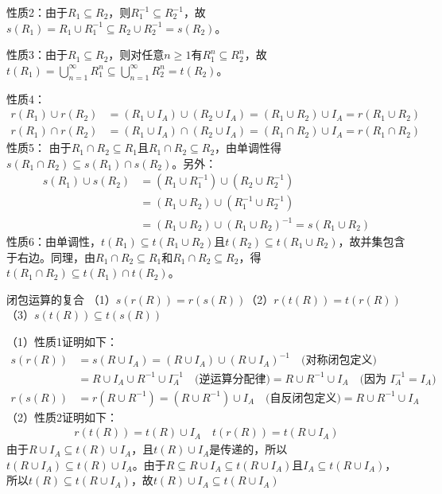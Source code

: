 \documentclass[lang=cn,11pt]{elegantbook}
\begin{document}
性质2：由于$R_1 \subseteq R_2$，则$R_1^{-1} \subseteq R_2^{-1}$，故$s(R_1) = R_1 \cup R_1^{-1} \subseteq R_2 \cup R_2^{-1} = s(R_2)$。

性质3：由于$R_1 \subseteq R_2$，则对任意$n \geq 1$有$R_1^n \subseteq R_2^n$，故$t(R_1) = \bigcup_{n=1}^{\infty} R_1^n \subseteq \bigcup_{n=1}^{\infty} R_2^n = t(R_2)$。

性质4：\vspace{-20pt}\begin{align*}
r(R_1) \cup r(R_2) &= (R_1 \cup I_A) \cup (R_2 \cup I_A) = (R_1 \cup R_2) \cup I_A = r(R_1 \cup R_2) \\
r(R_1) \cap r(R_2) &= (R_1 \cup I_A) \cap (R_2 \cup I_A) = (R_1 \cap R_2) \cup I_A = r(R_1 \cap R_2)
\end{align*}
性质5：
由于$R_1 \cap R_2 \subseteq R_1$且$R_1 \cap R_2 \subseteq R_2$，由单调性得$s(R_1 \cap R_2) \subseteq s(R_1) \cap s(R_2)$。另外：\vspace{-10pt}
\begin{align*}
s(R_1) \cup s(R_2) &= (R_1 \cup R_1^{-1}) \cup (R_2 \cup R_2^{-1}) \\
&= (R_1 \cup R_2) \cup (R_1^{-1} \cup R_2^{-1}) \\
&= (R_1 \cup R_2) \cup (R_1 \cup R_2)^{-1} = s(R_1 \cup R_2)
\end{align*}
性质6：由单调性，$t(R_1) \subseteq t(R_1 \cup R_2)$且$t(R_2) \subseteq t(R_1 \cup R_2)$，故并集包含于右边。同理，由$R_1 \cap R_2 \subseteq R_1$和$R_1 \cap R_2 \subseteq R_2$，得$t(R_1 \cap R_2) \subseteq t(R_1) \cap t(R_2)$。
\begin{theorem}{闭包运算的复合}
（1）$s(r(R)) = r(s(R))$\quad（2）$r(t(R)) = t(r(R))$\quad（3）$s(t(R)) \subseteq t(s(R))$
\end{theorem}
（1）性质1证明如下：
\begin{align*}
s(r(R)) &= s(R \cup I_A) = (R \cup I_A) \cup (R \cup I_A)^{-1} \quad \text{(对称闭包定义)} \\
&= R \cup I_A \cup R^{-1} \cup I_A^{-1} \quad \text{(逆运算分配律)} = R \cup R^{-1} \cup I_A \quad \text{(因为 $I_A^{-1} = I_A$)} \\
r(s(R)) &= r(R \cup R^{-1}) = (R \cup R^{-1}) \cup I_A \quad \text{(自反闭包定义)} = R \cup R^{-1} \cup I_A
\end{align*}
（2）性质2证明如下：
\begin{align*}
r(t(R)) = t(R) \cup I_A \quad 
t(r(R)) = t(R \cup I_A) 
\end{align*}
由于$R \cup I_A \subseteq t(R) \cup I_A$，且$t(R) \cup I_A$是传递的，所以$t(R \cup I_A) \subseteq t(R) \cup I_A$。由于$R \subseteq R \cup I_A \subseteq t(R \cup I_A)$且$I_A \subseteq t(R \cup I_A)$，所以$t(R) \subseteq t(R \cup I_A)$，故$t(R) \cup I_A \subseteq t(R \cup I_A)$\\
\end{document}
